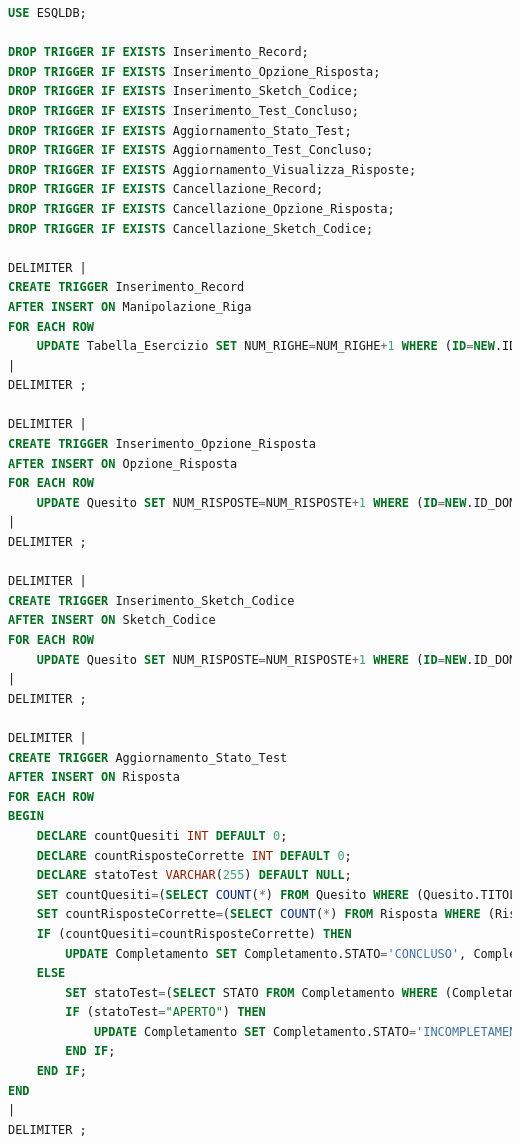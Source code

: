 \documentclass{article}
\begin{document}
\begin{lstlisting}[language=SQL, title=Codice SQL completo dei trigger dello schema della basi di dati.]
USE ESQLDB;

DROP TRIGGER IF EXISTS Inserimento_Record;
DROP TRIGGER IF EXISTS Inserimento_Opzione_Risposta;
DROP TRIGGER IF EXISTS Inserimento_Sketch_Codice;
DROP TRIGGER IF EXISTS Inserimento_Test_Concluso;
DROP TRIGGER IF EXISTS Aggiornamento_Stato_Test;
DROP TRIGGER IF EXISTS Aggiornamento_Test_Concluso;
DROP TRIGGER IF EXISTS Aggiornamento_Visualizza_Risposte;
DROP TRIGGER IF EXISTS Cancellazione_Record;
DROP TRIGGER IF EXISTS Cancellazione_Opzione_Risposta;
DROP TRIGGER IF EXISTS Cancellazione_Sketch_Codice;

DELIMITER |
CREATE TRIGGER Inserimento_Record
AFTER INSERT ON Manipolazione_Riga
FOR EACH ROW
    UPDATE Tabella_Esercizio SET NUM_RIGHE=NUM_RIGHE+1 WHERE (ID=NEW.ID_TABELLA);
|
DELIMITER ;

DELIMITER |
CREATE TRIGGER Inserimento_Opzione_Risposta
AFTER INSERT ON Opzione_Risposta
FOR EACH ROW
    UPDATE Quesito SET NUM_RISPOSTE=NUM_RISPOSTE+1 WHERE (ID=NEW.ID_DOMANDA_CHIUSA) AND (TITOLO_TEST=NEW.TITOLO_TEST);
|
DELIMITER ;

DELIMITER |
CREATE TRIGGER Inserimento_Sketch_Codice
AFTER INSERT ON Sketch_Codice
FOR EACH ROW
    UPDATE Quesito SET NUM_RISPOSTE=NUM_RISPOSTE+1 WHERE (ID=NEW.ID_DOMANDA_CODICE) AND (TITOLO_TEST=NEW.TITOLO_TEST);
|
DELIMITER ;

DELIMITER |
CREATE TRIGGER Aggiornamento_Stato_Test
AFTER INSERT ON Risposta
FOR EACH ROW
BEGIN
    DECLARE countQuesiti INT DEFAULT 0;
    DECLARE countRisposteCorrette INT DEFAULT 0;
    DECLARE statoTest VARCHAR(255) DEFAULT NULL;
    SET countQuesiti=(SELECT COUNT(*) FROM Quesito WHERE (Quesito.TITOLO_TEST=NEW.TITOLO_TEST));
    SET countRisposteCorrette=(SELECT COUNT(*) FROM Risposta WHERE (Risposta.TITOLO_TEST=NEW.TITOLO_TEST) AND (Risposta.EMAIL_STUDENTE=NEW.EMAIL_STUDENTE) AND (Risposta.ESITO=1));
    IF (countQuesiti=countRisposteCorrette) THEN 
        UPDATE Completamento SET Completamento.STATO='CONCLUSO', Completamento.DATA_ULTIMARISPOSTA=NOW() WHERE (Completamento.TITOLO_TEST=NEW.TITOLO_TEST) AND (Completamento.EMAIL_STUDENTE=NEW.EMAIL_STUDENTE);
    ELSE 
        SET statoTest=(SELECT STATO FROM Completamento WHERE (Completamento.TITOLO_TEST=NEW.TITOLO_TEST) AND (Completamento.EMAIL_STUDENTE = NEW.EMAIL_STUDENTE));
        IF (statoTest="APERTO") THEN
            UPDATE Completamento SET Completamento.STATO='INCOMPLETAMENTO', Completamento.DATA_PRIMARISPOSTA=NOW() WHERE (Completamento.TITOLO_TEST=NEW.TITOLO_TEST) AND (Completamento.EMAIL_STUDENTE=NEW.EMAIL_STUDENTE);
        END IF;
    END IF; 
END
|
DELIMITER ;


\end{lstlisting}
\end{document}
